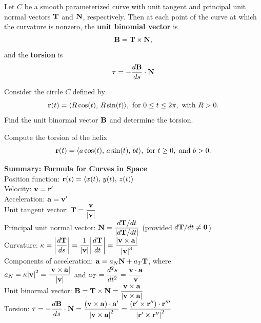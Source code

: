 \documentclass[mathNotesPreamble]{subfiles}
\begin{document}
  \begin{defn*}
    Let $C$ be a smooth parameterized curve with unit tangent and principal unit normal vectors ${\mathbf{T}}$ and ${\mathbf{N}}$, respectively. Then at each point of the curve at which the curvature is nonzero, the \textbf{unit binomial vector} is
      \[{\mathbf{B}}={\mathbf{T}}\times{\mathbf{N}},\]
    and the \textbf{torsion} is
      \[\tau=-\frac{d{\mathbf{B}}}{ds}\cdot{\mathbf{N}}\]
  \end{defn*}
  \pagebreak

  \begin{ex*}
    Consider the circle $C$ defined by
      \[{\mathbf{r}}(t)={\left\langle R\cos(t),\,R\sin(t) \right\rangle}, \textnormal{ for }0\leq t\leq 2\pi,\textnormal{ with }R>0.\]
    Find the unit binormal vector ${\mathbf{B}}$ and determine the torsion.
  \end{ex*}

  \begin{ex*}
    Compute the torsion of the helix
      \[{\mathbf{r}}(t)={\left\langle a\cos(t),\,a\sin(t),\,bt \right\rangle}, \textnormal{ for }t\geq 0,\textnormal{ and }b>0.\]
  \end{ex*}

  \pagebreak

  \begin{thmBox*}
    \textbf{Summary: Formula for Curves in Space}\\
    Position function: \tab ${\mathbf{r}}(t)={\left\langle x(t),\,y(t),\,z(t) \right\rangle}$\\[\baselineskip]
    Velocity: \tab ${\mathbf{v}}={\mathbf{r}}'$\\[\baselineskip]
    Acceleration: \tab ${\mathbf{a}}={\mathbf{v}}'$\\[\baselineskip]
    Unit tangent vector: \tab $\displaystyle{\mathbf{T}}=\frac{{\mathbf{v}}}{{\left\vert{\mathbf{v}}\right\vert}}$\\[\baselineskip]
    Principal unit normal vector: \tab $\displaystyle{\mathbf{N}}=\frac{d{\mathbf{T}}/dt}{{\left\vert d{\mathbf{T}}/dt\right\vert}}$ (provided $d{\mathbf{T}}/dt\neq \mathbf{0}$)\\[\baselineskip]
    Curvature: \tab $\displaystyle\kappa={\left\vert\frac{d{\mathbf{T}}}{ds}\right\vert}=\frac{1}{{\left\vert{\mathbf{v}}\right\vert}}{\left\vert\frac{d{\mathbf{T}}}{dt}\right\vert}=\frac{{\left\vert{\mathbf{v}}\times{\mathbf{a}}\right\vert}}{{\left\vert{\mathbf{v}}\right\vert}^3}$\\[\baselineskip]
    Components of acceleration: \tab ${\mathbf{a}}=a_N{\mathbf{N}}+a_T{\mathbf{T}}$, where\\[\baselineskip]
    \mbox{}\tab $\displaystyle a_N=\kappa{\left\vert{\mathbf{v}}\right\vert}^2=\frac{{\left\vert{\mathbf{v}}\times{\mathbf{a}}\right\vert}}{{\left\vert{\mathbf{v}}\right\vert}}$ and $\displaystyle a_T=\frac{d^2s}{dt^2}=\frac{{\mathbf{v}}\cdot{\mathbf{a}}}{{\mathbf{v}}}$\\[1.5\baselineskip]
    Unit binormal vector: \tab $\displaystyle{\mathbf{B}}={\mathbf{T}}\times{\mathbf{N}}=\frac{{\mathbf{v}}\times{\mathbf{a}}}{{\left\vert{\mathbf{v}}\times{\mathbf{a}}\right\vert}}$\\[\baselineskip]
    Torsion: \tab $\displaystyle\tau=-\frac{d{\mathbf{B}}}{ds}\cdot{\mathbf{N}}=\frac{{\left({\mathbf{v}}\times{\mathbf{a}}\right)}\cdot{\mathbf{a}}'}{{\left\vert{\mathbf{v}}\times{\mathbf{a}}\right\vert}^2}=\frac{{\left({\mathbf{r}}'\times{\mathbf{r}}''\right)}\cdot{\mathbf{r}}'''}{{\left\vert{\mathbf{r}}'\times{\mathbf{r}}''\right\vert}^2}$
  \end{thmBox*}

  \pagebreak
  
\end{document}
